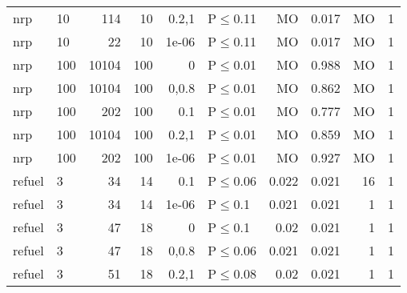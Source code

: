 \begin{longtable}{llrrrlrrrr}
 nrp           & 10       &    	114 &  10 & 0.2,1 & P$\leq$0.11  & MO      & 0.017   & MO      & 1    \\
 nrp           & 10       &     	22 &  10 & 1e-06 & P$\leq$0.11  & MO      & 0.017   & MO      & 1    \\
 nrp           & 100      &  	10104 & 100 & 0     & P$\leq$0.01  & MO      & 0.988   & MO      & 1    \\
 nrp           & 100      &  	10104 & 100 & 0,0.8 & P$\leq$0.01  & MO      & 0.862   & MO      & 1    \\
 nrp           & 100      &    	202 & 100 & 0.1   & P$\leq$0.01  & MO      & 0.777   & MO      & 1    \\
 nrp           & 100      &  	10104 & 100 & 0.2,1 & P$\leq$0.01  & MO      & 0.859   & MO      & 1    \\
 nrp           & 100      &    	202 & 100 & 1e-06 & P$\leq$0.01  & MO      & 0.927   & MO      & 1    \\
 refuel        & 3        &     	34 &  14 & 0.1   & P$\leq$0.06  & 0.022   & 0.021   & 16      & 1    \\
 refuel        & 3        &     	34 &  14 & 1e-06 & P$\leq$0.1   & 0.021   & 0.021   & 1       & 1    \\
 refuel        & 3        &     	47 &  18 & 0     & P$\leq$0.1   & 0.02    & 0.021   & 1       & 1    \\
 refuel        & 3        &     	47 &  18 & 0,0.8 & P$\leq$0.06  & 0.021   & 0.021   & 1       & 1    \\
 refuel        & 3        &     	51 &  18 & 0.2,1 & P$\leq$0.08  & 0.02    & 0.021   & 1       & 1    \\
\bottomrule
\end{longtable}
